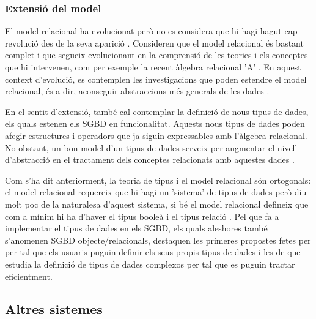 \subsubsection{Extensió del model}

El model relacional ha evolucionat però no es considera que hi hagi hagut
cap revolució des de la seva aparició
\parencite[cap.~19]{date06}. %
Consideren que el model relacional és bastant complet i que segueix
evolucionant en la comprensió de les teories i els conceptes que hi
intervenen, com per exemple la recent àlgebra relacional
'A' \parencite[ap.~A]{date06:_datab_types_relat_model}.  En aquest
context d'evolució, es contemplen les investigacions que poden
estendre el model relacional, és a dir, aconseguir abstraccions més
generals de les dades \parencite[cap.~25]{date06}. %


En el sentit d'extensió, també cal contemplar la definició de nous
tipus de dades, els quals estenen els SGBD en funcionalitat.  Aquests
nous tipus de dades poden afegir estructures i operadors que ja siguin
expressables amb l'àlgebra relacional. No obstant, un bon model d'un
tipus de dades serveix per augmentar el nivell d'abstracció en el
tractament dels conceptes relacionats amb aquestes
dades
\parencite{date02:_tempor_data_relat_model}. %

Com s'ha dit anteriorment, la teoria de tipus i el model relacional
són ortogonals: el model relacional requereix que hi hagi un 'sistema'
de tipus de dades però diu molt poc de la naturalesa d'aquest sistema,
si bé el model relacional defineix que com a mínim hi ha d'haver el
tipus booleà i el tipus
relació \parencite{date:thethirdmanifesto}. Pel que fa a implementar
el tipus de dades en els SGBD, els quals aleshores també s'anomenen
SGBD objecte/relacionals, destaquen les primeres propostes fetes per
\textcite{stonebraker86} per tal que els usuaris puguin definir els
seus propis tipus de dades i les de \textcite{seshadri98:_enhan} que
estudia la definició de tipus de dades complexos per tal que es puguin
tractar eficientment.


 




\subsection{Altres sistemes}

